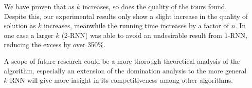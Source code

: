 \documentclass[11pt]{article}
\begin{document}
	We have proven that as $k$ increases, so does the quality of the tours found.
	Despite this, our experimental results only show a slight increase in the quality of solution as $k$ increases, meanwhile the running time increases by a factor of $n$.
	In one case a larger $k$ ($2$-RNN) was able to avoid an undesirable result from $1$-RNN, reducing the excess by over 350\%.
	
	
	A scope of future research could be a more thorough theoretical analysis of the algorithm, especially an extension of the domination analysis to the more general $k$-RNN will give more insight in its competitiveness among other algorithms. 

	
	
	
	
\end{document}
